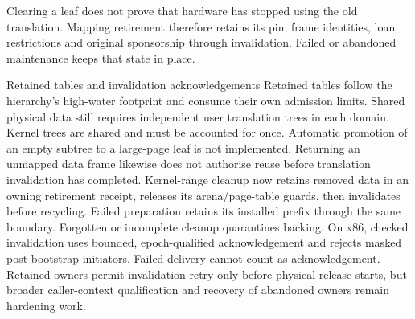 Clearing a leaf does not prove that hardware has stopped using the old
translation. Mapping retirement therefore retains its pin, frame identities,
loan restrictions and original sponsorship through invalidation. Failed or
abandoned maintenance keeps that state in place.

\begin{implementationdetail}{Retained tables and invalidation acknowledgements}
Retained tables follow the hierarchy's high-water footprint and consume their
own admission limits. Shared physical data still requires independent
user translation trees in each domain. Kernel trees are shared and must be
accounted for once. Automatic promotion of an empty subtree to a large-page
leaf is not implemented. Returning an unmapped data frame likewise does not
authorise reuse before translation invalidation has completed. Kernel-range
cleanup now retains removed data in an owning retirement receipt, releases its
arena/page-table guards, then invalidates before recycling. Failed preparation
retains its installed prefix through the same boundary. Forgotten or incomplete
cleanup quarantines backing. On x86, checked invalidation uses bounded,
epoch-qualified acknowledgement and rejects masked post-bootstrap initiators.
Failed delivery cannot count as acknowledgement. Retained owners permit
invalidation retry only before physical release starts, but broader caller-context
qualification and recovery of abandoned owners remain hardening work.
\end{implementationdetail}

